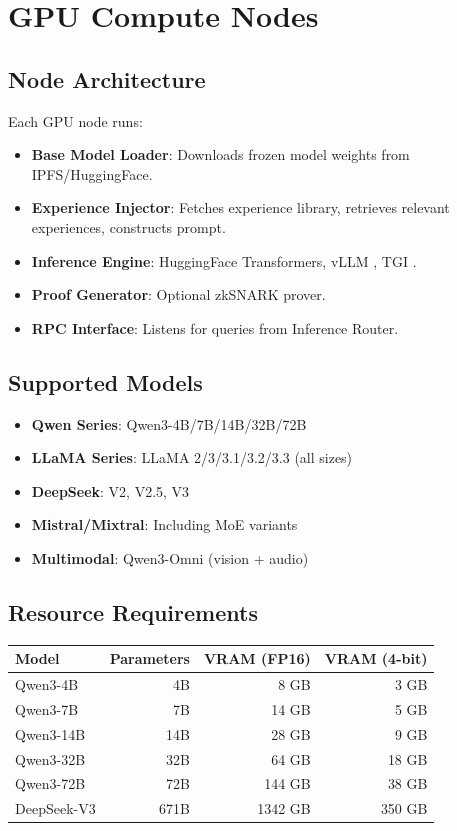 \section{GPU Compute Nodes}


\subsection{Node Architecture}

Each GPU node runs:
\begin{itemize}
\item \textbf{Base Model Loader}: Downloads frozen model weights from IPFS/HuggingFace.
\item \textbf{Experience Injector}: Fetches experience library, retrieves relevant experiences, constructs prompt.
\item \textbf{Inference Engine}: HuggingFace Transformers, vLLM \cite{kwon2023vllm}, TGI \cite{huggingface2023tgi}.
\item \textbf{Proof Generator}: Optional zkSNARK prover.
\item \textbf{RPC Interface}: Listens for queries from Inference Router.
\end{itemize}

\subsection{Supported Models}

\begin{itemize}
\item \textbf{Qwen Series}: Qwen3-4B/7B/14B/32B/72B \cite{qwen2024qwen3}
\item \textbf{LLaMA Series}: LLaMA 2/3/3.1/3.2/3.3 (all sizes) \cite{touvron2023llama}
\item \textbf{DeepSeek}: V2, V2.5, V3 \cite{bi2024deepseek}
\item \textbf{Mistral/Mixtral}: Including MoE variants \cite{jiang2023mistral}
\item \textbf{Multimodal}: Qwen3-Omni (vision + audio) \cite{chu2024qwen2audio}
\end{itemize}

\subsection{Resource Requirements}

\begin{center}
\begin{tabular}{lrrr}
\toprule
\textbf{Model} & \textbf{Parameters} & \textbf{VRAM (FP16)} & \textbf{VRAM (4-bit)} \\
\midrule
Qwen3-4B & 4B & 8 GB & 3 GB \\
Qwen3-7B & 7B & 14 GB & 5 GB \\
Qwen3-14B & 14B & 28 GB & 9 GB \\
Qwen3-32B & 32B & 64 GB & 18 GB \\
Qwen3-72B & 72B & 144 GB & 38 GB \\
DeepSeek-V3 & 671B & 1342 GB & 350 GB \\
\bottomrule
\end{tabular}
\end{center}

